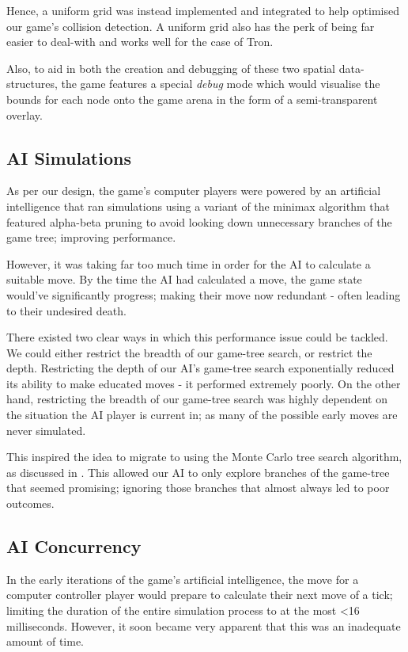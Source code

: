 \documentclass{standalone}
\begin{document}
			Hence, a uniform grid was instead implemented and integrated to help optimised our game's collision detection. A uniform grid also has the perk of being far easier to deal-with and works well for the case of Tron.

			Also, to aid in both the creation and debugging of these two spatial data-structures, the game features a special \emph{debug} mode which would visualise the bounds for each node onto the game arena in the form of a semi-transparent overlay.

		\subsection{AI Simulations} \label{sec:aiSimulations}
			As per our design, the game's computer players were powered by an artificial intelligence that ran simulations using a variant of the minimax algorithm \parencite{minimax} that featured alpha-beta pruning \parencite{alphaBeta} to avoid looking down unnecessary branches of the game tree; improving performance.

			However, it was taking far too much time in order for the AI to calculate a suitable move. By the time the AI had calculated a move, the game state would've significantly progress; making their move now redundant - often leading to their undesired death.

			There existed two clear ways in which this performance issue could be tackled. We could either restrict the breadth of our game-tree search, or restrict the depth. Restricting the depth of our AI's game-tree search exponentially reduced its ability to make educated moves - it performed extremely poorly. On the other hand, restricting the breadth of our game-tree search was highly dependent on the situation the AI player is current in; as many of the possible early moves are never simulated.

			This inspired the idea to migrate to using the Monte Carlo tree search algorithm, as discussed in . This allowed our AI to only explore branches of the game-tree that seemed promising; ignoring those branches that almost always led to poor outcomes.

		\subsection{AI Concurrency}
			In the early iterations of the game's artificial intelligence, the move for a computer controller player would prepare to calculate their next move of a tick; limiting the duration of the entire simulation process to at the most \textless 16 milliseconds. However, it soon became very apparent that this was an inadequate amount of time.
\end{document}
